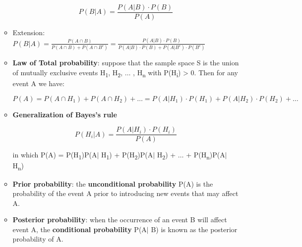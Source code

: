 \documentclass[12pt]{report}
\renewcommand{\_}{\kern-1.5pt\textunderscore\kern-1.5pt}
\begin{document}
\begin{itemize}
\begin{itemize}
 \[ P \left( B \vert A \right) =\frac{P \left( A \vert B \right)  \cdot P \left( B \right) }{P \left( A \right) } \] \par

	\item Extension:  \( P \left( B \vert A \right) =\frac{P \left( A \cap B \right) }{P \left( A \cap B \right) +P \left( A \cap B^{c} \right) }=\frac{P \left( A \vert B \right)  \cdot P \left( B \right) }{P \left( A \vert B \right)  \cdot P \left( B \right) +P \left( A \vert B^{c} \right)  \cdot P \left( B^{c} \right) } \) \par

	\item \textbf{Law of Total probability}: suppose that the sample space S is the union of mutually exclusive events H\textsubscript{1}, H\textsubscript{2}, $ \ldots $ , H\textsubscript{n} with P(H\textsubscript{i}) > 0. Then for any event A we have:\par

 \[ P \left( A \right) =P \left( A \cap H_{1} \right) +P \left( A \cap H_{2} \right) + \ldots =P \left( A \vert H_{1} \right)  \cdot P \left( H_{1} \right) +P \left( A \vert H_{2} \right)  \cdot P \left( H_{2} \right) + \ldots  \] \par

	\item \textbf{Generalization of Bayes’s rule}\par

 \[ P \left( H_{i} \vert A \right) =\frac{P \left( A \vert H_{i} \right)  \cdot P \left( H_{i} \right) }{P \left( A \right) } \] \par

in which P(A) = P(H\textsubscript{1})P(A$ \vert $ H\textsubscript{1}) + P(H\textsubscript{2})P(A$ \vert $ H\textsubscript{2}) + $ \ldots $  + P(H\textsubscript{n})P(A$ \vert $ H\textsubscript{n})\par

	\item \textbf{Prior probability}: the \textbf{unconditional probability} P(A) is the probability of the event A prior to introducing new events that may affect A. \par

	\item \textbf{Posterior probability}: when the occurrence of an event B will affect event A, the \textbf{conditional probability} P(A$ \vert $ B) is known as the posterior probability of A. \par



\end{itemize}
\end{itemize}
\end{document}

